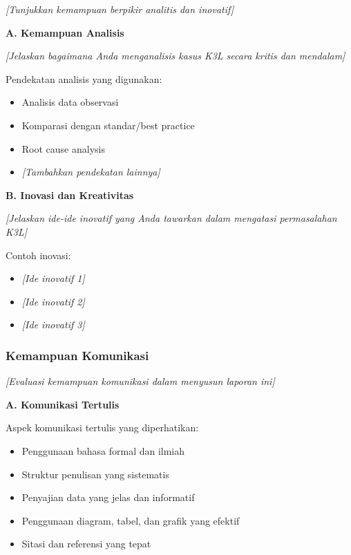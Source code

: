 \textit{[Tunjukkan kemampuan berpikir analitis dan inovatif]}

\textbf{A. Kemampuan Analisis}

\textit{[Jelaskan bagaimana Anda menganalisis kasus K3L secara kritis dan mendalam]}

Pendekatan analisis yang digunakan:
\begin{itemize}
    \item Analisis data observasi
    \item Komparasi dengan standar/best practice
    \item Root cause analysis
    \item \textit{[Tambahkan pendekatan lainnya]}
\end{itemize}

\vspace{0.5cm}

\textbf{B. Inovasi dan Kreativitas}

\textit{[Jelaskan ide-ide inovatif yang Anda tawarkan dalam mengatasi permasalahan K3L]}

Contoh inovasi:
\begin{itemize}
    \item \textit{[Ide inovatif 1]}
    \item \textit{[Ide inovatif 2]}
    \item \textit{[Ide inovatif 3]}
\end{itemize}

\vspace{0.5cm}

\subsubsection{Kemampuan Komunikasi}

\textit{[Evaluasi kemampuan komunikasi dalam menyusun laporan ini]}

\textbf{A. Komunikasi Tertulis}

Aspek komunikasi tertulis yang diperhatikan:
\begin{itemize}
    \item Penggunaan bahasa formal dan ilmiah
    \item Struktur penulisan yang sistematis
    \item Penyajian data yang jelas dan informatif
    \item Penggunaan diagram, tabel, dan grafik yang efektif
    \item Sitasi dan referensi yang tepat
\end{itemize}

